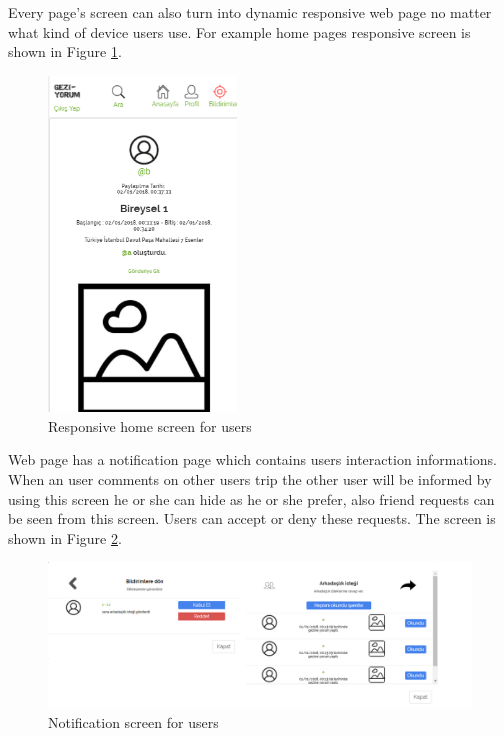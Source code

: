 \newpage

Every page's screen can also turn into dynamic responsive web page no matter what kind of device users use. For example home pages responsive screen is shown in Figure  \ref{fig:homepageRespon}.

\begin{figure}[!htbp]
\centering
\includegraphics[width=50mm,scale=0.5]{projectChapters/images/homepageResponsive.png}
\caption{Responsive home screen for users}
\label{fig:homepageRespon}
\end{figure}

\newpage

Web page has a notification page which contains users interaction informations. When an user comments on other users trip the other user will be informed by using this screen he or she can hide as he or she prefer, also friend requests can be seen from this screen. Users can accept or deny these requests. The screen is shown in Figure  \ref{fig:notificationPage}.

\begin{figure}[!htbp]
\centering
\includegraphics[width=\textwidth]{projectChapters/images/notificationPage.png}
\caption{Notification screen for users}
\label{fig:notificationPage}
\end{figure}


